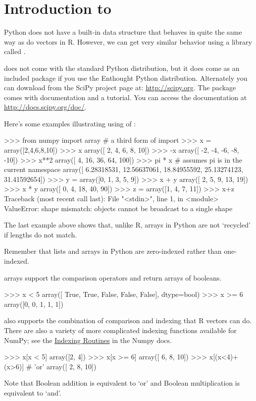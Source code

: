 
\section{Introduction to \numpy}

Python does not have a built-in data
structure that behaves in quite the same way as do vectors in R.
However, we can get very similar behavior using a library called \numpy.

\numpy does not come with the standard Python distribution, but it does come
as an included package if you use the Enthought Python distribution.
Alternately you can download \numpy from the SciPy project page at:
\url{http://scipy.org}. The \numpy package comes with documentation and
a tutorial. You can access the documentation at
\url{http://docs.scipy.org/doc/}.

Here's some examples illustrating using of \numpy:
\begin{python}
>>> from numpy import array # a third form of import 
>>> x = array([2,4,6,8,10])
>>> x
array([ 2,  4,  6,  8, 10])
>>> -x
array([ -2,  -4,  -6,  -8, -10])
>>> x**2
array([  4,  16,  36,  64, 100])
>>> pi * x # assumes pi is in the current namespace
array([  6.28318531,  12.56637061,  18.84955592,  25.13274123,  31.41592654])
>>> y = array([0, 1, 3, 5, 9])
>>> x + y
array([ 2,  5,  9, 13, 19])
>>> x * y
array([ 0,  4, 18, 40, 90])
>>> z = array([1, 4, 7, 11])
>>> x+z
Traceback (most recent call last):
  File "<stdin>", line 1, in <module>
ValueError: shape mismatch: objects cannot be broadcast to a single shape
\end{python}
%
The last example above shows that, unlike R, \numpy arrays in Python are
not `recycled' if lengths do not match.

Remember that lists and arrays in Python are zero-indexed rather than
one-indexed.
%

\numpy arrays support the comparison operators and return arrays of
booleans.
\begin{python}
>>> x < 5 
array([ True, True, False, False, False], dtype=bool)
>>> x >= 6 
array([0, 0, 1, 1, 1])
\end{python}
%
\numpy also supports the combination of comparison and indexing that R vectors
can do. There are also a variety of more complicated indexing functions
available for NumPy; see the
\href{http://docs.scipy.org/doc/numpy/reference/routines.indexing.html}{Indexing Routines} in the Numpy docs.
%
\begin{python}
>>> x[x < 5]
array([2, 4])
>>> x[x >= 6]
array([ 6,  8, 10])
>>> x[(x<4)+(x>6)]  # 'or'
array([ 2,  8, 10])
\end{python}
%
Note that Boolean addition is equivalent to `or' and Boolean
multiplication is equivalent to `and'.

